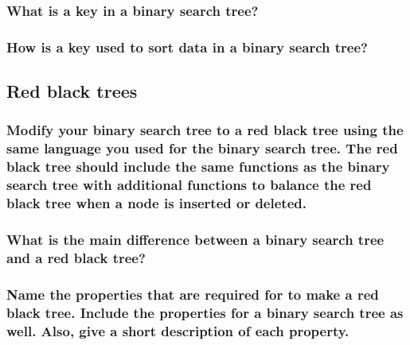 \documentclass{article}
\begin{document}
\vspace{24pt}

\subsubsection{What is a key in a binary search tree?}

\vspace{108pt}

\subsubsection{How is a key used to sort data in a binary search tree?}
\pagebreak{}

\begin{Large}
\subsection{\textbf{Red black trees}}
\end{Large}

\subsubsection{Modify your binary search tree to a red black tree using the same language you used for the binary search tree. The red black tree should include the same functions as the binary search tree with additional functions to balance the red black tree when a node is inserted or deleted.}

\vspace{24pt}

\subsubsection{What is the main difference between a binary search tree and a red black tree?}

\vspace{108pt}

\subsubsection{Name the properties that are required for to make a red black tree. Include the properties for a binary search tree as well. Also, give a short description of each property.}

\pagebreak{}
\end{document}
